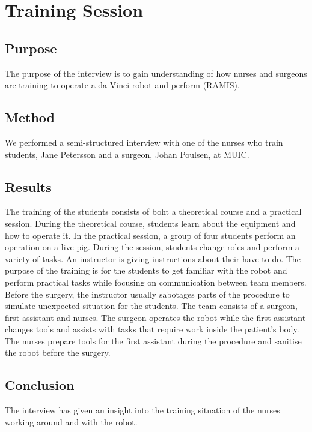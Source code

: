 \chapter*{Training Session}
\section*{Purpose}
The purpose of the interview is to gain understanding of how nurses and surgeons are training to operate a da Vinci robot and perform (RAMIS). 

\section*{Method}
We performed a semi-structured interview with one of the nurses who train students, Jane Petersson and a surgeon, Johan Poulsen, at MUIC.
 
\section*{Results}
The training of the students consists of boht a theoretical course and a practical session. During the theoretical course, students learn about the equipment and how to operate it. In the practical session, a group of four students perform an operation on a live pig. During the session, students change roles and perform a variety of tasks. An instructor is giving instructions about their  have to do. The purpose of the training is for the students to get familiar with the robot and perform practical tasks while focusing on communication between team members. Before the surgery, the instructor usually sabotages parts of the procedure to simulate unexpected situation for the students.
The team consists of a surgeon, first assistant and nurses. The surgeon operates the robot while the first assistant changes tools and assists with tasks that require work inside the patient's body. The nurses prepare tools for the first assistant during the procedure and sanitise the robot before the surgery.
 

\section*{Conclusion}
The interview has given an insight into the training situation of the nurses working around and with the robot.